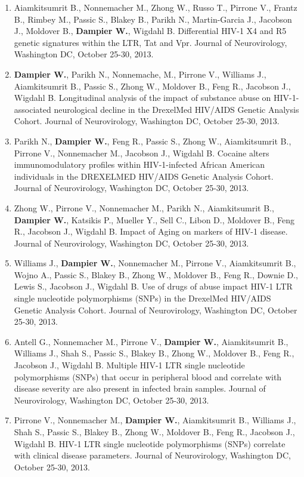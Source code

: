 \documentclass[a4paper,11pt]{article}
\begin{document}
\begin{enumerate}
\begin{itemize}
\begin{enumerate}[label=\arabic{enumii}.]
   \item Aiamkitsumrit B., Nonnemacher M., Zhong W., Russo T., Pirrone V., Frantz B., Rimbey M., Passic S., Blakey B., Parikh N., Martin-Garcia J., Jacobson J., Moldover B., \textbf{Dampier W.}, Wigdahl B. Differential HIV-1 X4 and R5 genetic signatures within the LTR, Tat and Vpr. Journal of Neurovirology, Washington DC, October 25-30, 2013.
   \item \textbf{Dampier W.}, Parikh N., Nonnemache, M., Pirrone V., Williams J., Aiamkitsumrit B., Passic S., Zhong W., Moldover B., Feng R., Jacobson J., Wigdahl B. Longitudinal analysis of the impact of substance abuse on HIV-1-associated neurological decline in the DrexelMed HIV/AIDS Genetic Analysis Cohort. Journal of Neurovirology, Washington DC, October 25-30, 2013.
   \item Parikh N., \textbf{Dampier W.}, Feng R., Passic S., Zhong W., Aiamkitsumrit B., Pirrone V., Nonnemacher M., Jacobson J., Wigdahl B. Cocaine alters immunomodulatory profiles within HIV-1-infected African American individuals in the DREXELMED HIV/AIDS Genetic Analysis Cohort. Journal of Neurovirology, Washington DC, October 25-30, 2013.
   \item Zhong W., Pirrone V., Nonnemacher M., Parikh N., Aiamkitsumrit B., \textbf{Dampier W.}, Katsikis P., Mueller Y., Sell C., Libon D., Moldover B., Feng R., Jacobson J., Wigdahl B. Impact of Aging on markers of HIV-1 disease. Journal of Neurovirology, Washington DC, October 25-30, 2013.
   \item Williams J., \textbf{Dampier W.}, Nonnemacher M., Pirrone V., Aiamkitsumrit B., Wojno A., Passic S., Blakey B., Zhong W., Moldover B., Feng R., Downie D., Lewis S., Jacobson J., Wigdahl B. Use of drugs of abuse impact HIV-1 LTR single nucleotide polymorphisms (SNPs) in the DrexelMed HIV/AIDS Genetic Analysis Cohort. Journal of Neurovirology, Washington DC, October 25-30, 2013.
   \item Antell G., Nonnemacher M., Pirrone V., \textbf{Dampier W.}, Aiamkitsumrit B., Williams J., Shah S., Passic S., Blakey B., Zhong W., Moldover B., Feng R., Jacobson J., Wigdahl B. Multiple HIV-1 LTR single nucleotide polymorphisms (SNPs) that occur in peripheral blood and correlate with disease severity are also present in infected brain samples. Journal of Neurovirology, Washington DC, October 25-30, 2013.
   \item Pirrone V., Nonnemacher M., \textbf{Dampier W.}, Aiamkitsumrit B., Williams J., Shah S., Passic S., Blakey B., Zhong W., Moldover B., Feng R., Jacobson J., Wigdahl B. HIV-1 LTR single nucleotide polymorphisms (SNPs) correlate with clinical disease parameters. Journal of Neurovirology, Washington DC, October 25-30, 2013.
  \end{enumerate}


\end{itemize}
\end{enumerate}
\end{document}
